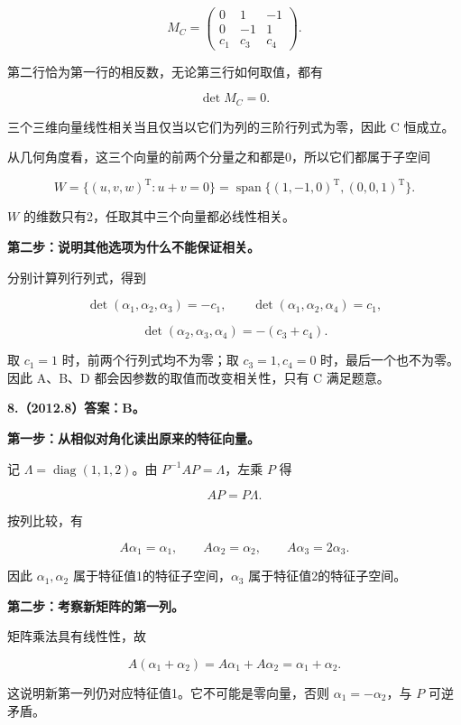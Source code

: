 \documentclass[UTF8,11pt,fontset=windows]{ctexart}
\begin{document}
$$
M_C=\begin{pmatrix}
0&1&-1\\
0&-1&1\\
c_1&c_3&c_4
\end{pmatrix}.
$$

第二行恰为第一行的相反数，无论第三行如何取值，都有

$$
\det M_C=0.
$$

三个三维向量线性相关当且仅当以它们为列的三阶行列式为零，因此 C 恒成立。

从几何角度看，这三个向量的前两个分量之和都是0，所以它们都属于子空间

$$
W=\{(u,v,w)^{\mathrm T}:u+v=0\}
=\operatorname{span}\{(1,-1,0)^{\mathrm T},(0,0,1)^{\mathrm T}\}.
$$

$W$ 的维数只有2，任取其中三个向量都必线性相关。

\textbf{第二步：说明其他选项为什么不能保证相关。}

分别计算列行列式，得到

$$
\det(\alpha_1,\alpha_2,\alpha_3)=-c_1,
\qquad
\det(\alpha_1,\alpha_2,\alpha_4)=c_1,
$$

$$
\det(\alpha_2,\alpha_3,\alpha_4)=-(c_3+c_4).
$$

取 $c_1=1$ 时，前两个行列式均不为零；取 $c_3=1,c_4=0$ 时，最后一个也不为零。因此 A、B、D 都会因参数的取值而改变相关性，只有 C 满足题意。

\clearpage

\textbf{8.（2012.8）答案：B。}

\textbf{第一步：从相似对角化读出原来的特征向量。}

记 $\Lambda=\operatorname{diag}(1,1,2)$。由 $P^{-1}AP=\Lambda$，左乘 $P$ 得

$$
AP=P\Lambda.
$$

按列比较，有

$$
A\alpha_1=\alpha_1,
\qquad A\alpha_2=\alpha_2,
\qquad A\alpha_3=2\alpha_3.
$$

因此 $\alpha_1,\alpha_2$ 属于特征值1的特征子空间，$\alpha_3$ 属于特征值2的特征子空间。

\textbf{第二步：考察新矩阵的第一列。}

矩阵乘法具有线性性，故

$$
A(\alpha_1+\alpha_2)
=A\alpha_1+A\alpha_2
=\alpha_1+\alpha_2.
$$

这说明新第一列仍对应特征值1。它不可能是零向量，否则 $\alpha_1=-\alpha_2$，与 $P$ 可逆矛盾。
\end{document}
